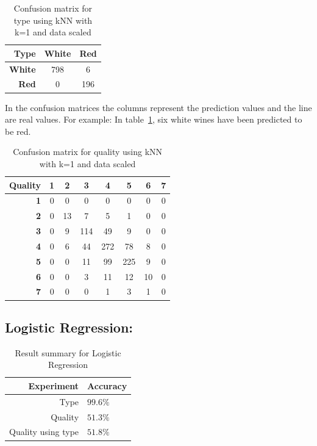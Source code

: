 \documentclass[twoside]{article}
\begin{document}
\begin{multicols}{2}
\begin{table}[H]
\caption{Confusion matrix for type using kNN with k=1 and data scaled}
\label{ConfusionKNNscaled}
\centering
\begin{tabular}{r||c|c}
\textbf{Type} & \textbf{White} & \textbf{Red} \\
\hline \hline
\textbf{White} & 798  & 6\\
\hline
\textbf{Red} & 0 & 196\\
\end{tabular}
\end{table}

In the confusion matrices the columns represent the prediction values and the line are real values. For example: In table~\ref{ConfusionKNNscaled}, six white wines have been predicted to be red.

\begin{table}[H]
\caption{Confusion matrix for quality using kNN with k=1 and data scaled}
\centering
\begin{tabular}{r||c|c|c|c|c|c|c}
\textbf{Quality} & \textbf{1} & \textbf{2} & \textbf{3} & \textbf{4} & \textbf{5} & \textbf{6} & \textbf{7}\\
\hline \hline
\textbf{1} & 0 & 0 & 0 & 0 & 0 & 0 & 0\\
\hline
\textbf{2} & 0 & 13 & 7 & 5 & 1 & 0 & 0\\
\hline
\textbf{3} & 0 & 9 & 114 & 49 & 9 & 0 & 0\\
\hline
\textbf{4} & 0 & 6 & 44 & 272 & 78 & 8 & 0\\
\hline
\textbf{5} & 0 & 0 & 11 & 99 & 225 & 9 & 0\\
\hline
\textbf{6} & 0 & 0 & 3 & 11 & 12 & 10 & 0\\
\hline
\textbf{7} & 0 & 0 & 0 & 1 & 3 & 1 & 0\\
\end{tabular}
\end{table}


\subsection*{\textbf{Logistic Regression:}}
\begin{table}[H]
\caption{Result summary for Logistic Regression}
\centering
\begin{tabular}{r|l}
\textbf{Experiment} & \textbf{Accuracy}\\
\midrule
Type & $99.6\%$\\
Quality & $51.3\%$\\
Quality using type & $51.8\%$\\
\end{tabular}
\end{table}


\end{multicols}
\end{document}
